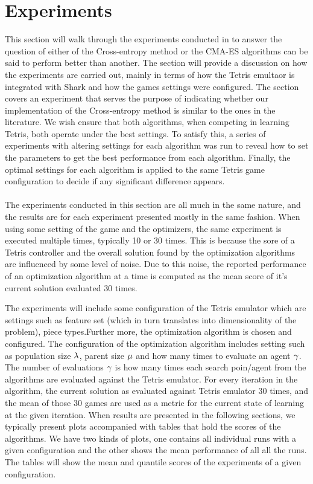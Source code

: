 \section{Experiments}


This section will walk through the experiments conducted in to answer the question 
of either of the Cross-entropy method or the CMA-ES algorithms can be said to perform better
than another. The section will provide a discussion on how the experiments are carried out, mainly
in terms of how the Tetris emultaor is integrated with Shark and how the games settings were configured.
The section covers an experiment that serves the purpose of indicating whether our implementation 
of the Cross-entropy method is similar to the ones in the literature. 
We wish ensure that both algorithms, when competing in learning Tetris, both operate under the 
best settings. To satisfy this, a series of experiments with altering settings for each 
algorithm was run to reveal how to set the parameters to get the best performance from 
each algorithm. Finally, the optimal settings for each algorithm is applied to
the same Tetris game configuration to decide if any significant difference appears.\\
\\
The experiments conducted in this section are all much in the same nature, and the 
results are for each experiment presented mostly in the same fashion. When using some setting 
of the game and the optimizers, the same experiment is executed multiple times, typically 
10 or 30 times. This is because the sore of a Tetris controller and the overall 
solution found by the optimization algorithms are influenced by some level of noise.
Due to this noise, the reported performance of an optimization algorithm at a time
is computed as the mean score of it's current solution evaluated 30 times.
\begin{changebar}
The experiments will include some configuration of the Tetris emulator which are settings
such as feature set (which in turn translates into dimensionality of the problem),
piece types.Further more, the optimization algorithm is chosen and configured. The
configuration of the optimization algorithm includes setting such as population size
$\lambda$, parent size $\mu$ and how many times
to evaluate an agent $\gamma$. The number of evaluations $\gamma$
is how many times each search poin/agent from the algorithms are evaluated against the 
Tetris emulator. For every iteration in the algorithm, the current solution as 
evaluated against Tetris emulator 30 times, and the mean of those 30 games are used as
a metric for the current state of learning at the given iteration. When results are presented 
in the following sections, we typically present plots accompanied with tables 
that hold the scores of the algorithms. We have two kinds of plots, one contains all
individual runs with a given configuration and the other shows the mean performance
of all all the runs. The tables will show the mean and quantile scores of the experiments
of a given configuration.\end{changebar}\\

